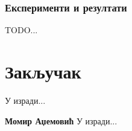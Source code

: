 \documentclass[11pt,oneside]{memoir}
\begin{document}
\subsection{Експерименти и резултати}

TODO...

\chapter{Закључак}
У изради...

\backmatter




\begin{biografija}
\textbf{Момир Аџемовић} 
У изради...
\end{biografija}
\end{document}
